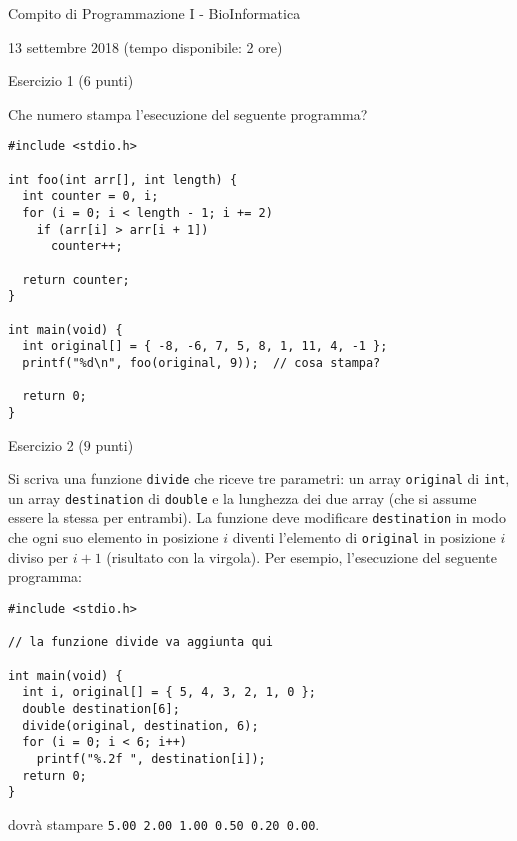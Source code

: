 \documentclass[12pt]{article}
\begin{document}
\begin{center}{\LARGE Compito di Programmazione I - BioInformatica}\\
\vspace*{-2ex}
\begin{center}
  \large 13 settembre 2018 (tempo disponibile: 2 ore)
\end{center}
\end{center}

\begin{center}{\Large Esercizio 1} ($6$ punti)
\end{center}
Che numero stampa l'esecuzione del seguente programma?
\begin{lstlisting}
#include <stdio.h>

int foo(int arr[], int length) {
  int counter = 0, i;
  for (i = 0; i < length - 1; i += 2)
    if (arr[i] > arr[i + 1])
      counter++;

  return counter;
}

int main(void) {
  int original[] = { -8, -6, 7, 5, 8, 1, 11, 4, -1 };
  printf("%d\n", foo(original, 9));  // cosa stampa?

  return 0;
}
\end{lstlisting}

\vspace*{1ex}
\begin{center}{\Large Esercizio 2} ($9$ punti)
\end{center}
Si scriva una funzione \texttt{divide} che riceve tre parametri: un array
\texttt{original} di \texttt{int}, un array \texttt{destination} di \texttt{double}
e la lunghezza dei due array (che si assume essere la stessa per entrambi).
La funzione deve modificare \texttt{destination} in modo che ogni suo elemento
in posizione $i$ diventi l'elemento di \texttt{original} in posizione $i$
diviso per $i + 1$ (risultato con la virgola). Per esempio, l'esecuzione
del seguente programma:

\begin{lstlisting}
#include <stdio.h>

// la funzione divide va aggiunta qui

int main(void) {
  int i, original[] = { 5, 4, 3, 2, 1, 0 };
  double destination[6];
  divide(original, destination, 6);
  for (i = 0; i < 6; i++)
    printf("%.2f ", destination[i]);
  return 0;
}
\end{lstlisting}
dovr\`a stampare \texttt{5.00 2.00 1.00 0.50 0.20 0.00}.
\newpage
\end{document}
